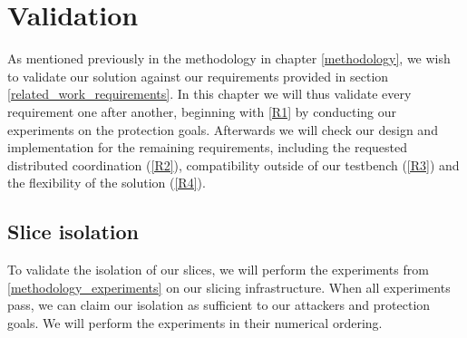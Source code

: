 \chapter{Validation}
\label{validation}
\iffalse
For each experiment:
\begin{itemize}
    \item Outcome of the experiment
    \item Is it the outcome we expected?
\end{itemize}
\fi

As mentioned previously in the methodology in chapter \ref{methodology}, we wish to validate our solution against our requirements provided in section \ref{related_work_requirements}. In this chapter we will thus validate every requirement one after another, beginning with \ref{R1} by conducting our experiments on the protection goals. Afterwards we will check our design and implementation for the remaining requirements, including the requested distributed coordination (\ref{R2}), compatibility outside of our testbench (\ref{R3}) and the flexibility of the solution (\ref{R4}).

\section{Slice isolation}
To validate the isolation of our slices, we will perform the experiments from \ref{methodology_experiments} on our slicing infrastructure. When all experiments pass, we can claim our isolation as sufficient to our attackers and protection goals.
We will perform the experiments in their numerical ordering.

